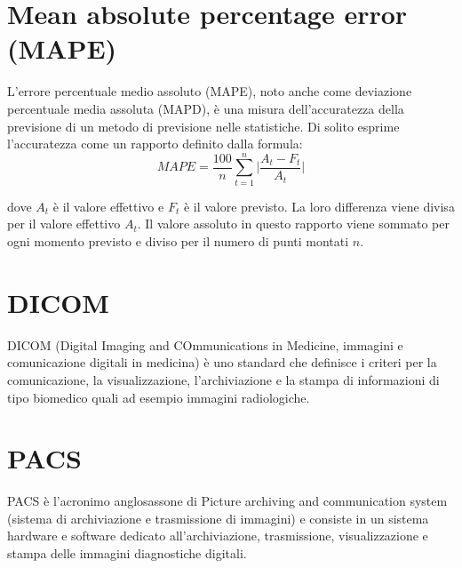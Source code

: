 \documentclass[12pt,a4paper]{report}
\begin{document}
\section*{Mean absolute percentage error (MAPE)}
\label{appendix:MAPE}
L'errore percentuale medio assoluto (MAPE), noto anche come deviazione percentuale media assoluta (MAPD), è una misura dell'accuratezza della previsione di un metodo di previsione nelle statistiche. Di solito esprime l'accuratezza come un rapporto definito dalla formula:
\begin{equation}
    {\displaystyle MAPE = \frac{100}{n} \sum\limits_{t=1}^{n} \vert \frac{A_t - F_t}{A_t} \vert}
\end{equation}

dove $A_t$ è il valore effettivo e $F_t$ è il valore previsto. La loro differenza viene divisa per il valore effettivo $A_t$. Il valore assoluto in questo rapporto viene sommato per ogni momento previsto e diviso per il numero di punti montati $n$.

\section*{DICOM}
\label{appendix:DICOM}
DICOM (Digital Imaging and COmmunications in Medicine, immagini e comunicazione digitali in medicina) è uno standard che definisce i criteri per la comunicazione, la visualizzazione, l'archiviazione e la stampa di informazioni di tipo biomedico quali ad esempio immagini radiologiche.

\section*{PACS}
\label{appendix:PACS}
PACS è l'acronimo anglosassone di Picture archiving and communication system (sistema di archiviazione e trasmissione di immagini) e consiste in un sistema hardware e software dedicato all'archiviazione, trasmissione, visualizzazione e stampa delle immagini diagnostiche digitali.


\nocite{*}


\end{document}
